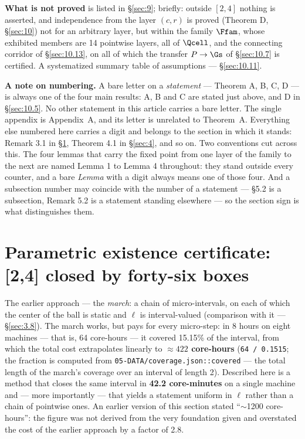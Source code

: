 \textbf{What is not proved} is listed in \S\ref{sec:9}; briefly: outside $[2, 4]$ nothing
is asserted, and independence from the layer $(c, r)$ is proved (Theorem D,
\S\ref{sec:10}) not for an arbitrary layer, but within the family $\Ffam$, whose
exhibited members are
14 pointwise layers, all of $\Qcell$, and the connecting corridor of \S\ref{sec:10.13}, on all
of which the transfer $P \to \Gs$ of \S\ref{sec:10.7} is certified. A systematized summary table of
assumptions --- \S\ref{sec:10.11}.

\ifx\JOURNALVERSION\undefined
\textbf{A note on numbering.} A bare letter on a \emph{statement} --- Theorem
A, B, C, D --- is always one of the four main results: A, B and C are stated
just above, and D in \S\ref{sec:10.5}. No other
statement in this article carries a bare letter. The single appendix is
Appendix~A, and its letter is unrelated to Theorem~A. Everything else numbered here carries a digit and
belongs to the section in which it stands: Remark 3.1 in \S\ref{sec:3},
Theorem 4.1 in \S\ref{sec:4}, and so on. Two conventions cut across this. The
four lemmas that carry the fixed point from one layer of the family to the next
are named Lemma 1 to Lemma 4 throughout: they stand outside every counter, and
a bare \emph{Lemma} with a digit always means one of those four. And a
subsection number may coincide with the number of a statement --- \S5.2 is a
subsection, Remark 5.2 is a statement standing elsewhere --- so the section
sign is what distinguishes them.
\fi



\section{Parametric existence certificate: [2,4] closed by forty-six boxes}
\label{sec:3}

The earlier approach --- the \emph{march}: a chain of micro-intervals, on each of which
the center of the ball is static and $\ell$ is interval-valued (comparison with it --- \S\ref{sec:3.8}).
The march works, but pays for every micro-step: in 8 hours on eight machines ---
that is, 64 core-hours --- it covered 15.15\% of the interval, from which the total
cost extrapolates linearly to \textbf{$\approx 422$ core-hours} (\texttt{64 / 0.1515}; the fraction is
computed from \texttt{05-\allowbreak DATA/\allowbreak coverage.json::\allowbreak covered} --- the total length of the march's
coverage over an interval of length 2). Described here is a method that closes the
same interval in \textbf{42.2 core-minutes} on a single machine and --- more importantly
--- that yields a statement uniform in $\ell$ rather than a chain of pointwise ones.
An earlier version of this section stated ``$\sim$1200 core-hours'': the figure was not derived
from the very foundation given and overstated the cost of the earlier approach by
a factor of 2.8.


